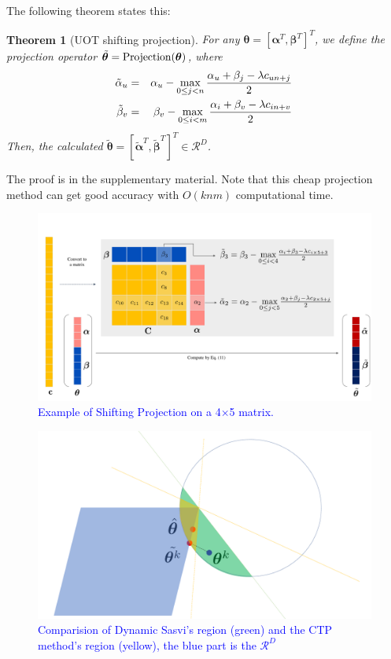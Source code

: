 \documentclass[twoside]{article}
\theoremstyle{plain}
\newtheorem{thm}{Theorem}
\renewcommand{\vec}[1]{\bm{#1}}
\newcommand{\changeXS}[1]{\textcolor{blue}{#1}}
\begin{document}
The following theorem states this:
\begin{thm}[UOT shifting projection]
\label{Thm:UOT_ShiftProjection}
For any $\vec{\theta} = [{\vec{\alpha}}^T,{\vec{\beta}}^T]^T$, we define the projection operator $\tilde{\vec{\theta}}={\rm Projection}(\vec{\theta})$, where 
\changeXS{
\begin{eqnarray}
\tilde{{\alpha}}_u &=& {{\alpha}}_u - \max_{0\leq j < n} \frac{{{\alpha}}_u +{{\beta}}_j - \lambda{c}_{un+j}}{2} \notag\\
\tilde{{\beta}}_v &=& {{\beta}}_v - \max_{0 \leq i < m} \frac{{{\alpha}}_i +{{\beta}}_v - \lambda{c}_{in+v}}{2}\\
\label{eq:uotproj}
\end{eqnarray}
}
Then, the calculated $\tilde{\vec{\theta}} = [\tilde{\vec{\alpha}}^T,\tilde{\vec{\beta}}^T]^T \in \mathcal{R}^{D}$.
\end{thm}
The proof is in the supplementary material. Note that this cheap projection method can get good accuracy with $O(knm)$ computational time. 

\begin{figure}[h]
\centering
\includegraphics[width = \linewidth]{pic/matrix}
\caption{\changeXS{Example of Shifting Projection on a 4$\times$5 matrix.}}
\label{Fig:structure}
\end{figure}



\begin{figure}[h]
\centering
\includegraphics[width = \linewidth]{pic/area}
\caption{\changeXS{Comparision of Dynamic Sasvi's region (green) and the CTP method's region (yellow), the blue part is the $\mathcal{R}^{D}$}}
\end{figure}
\end{document}
